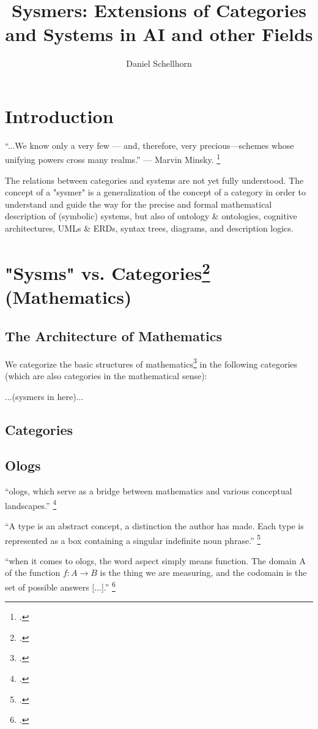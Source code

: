 \documentclass[12pt,a4paper]{article}
\title{Sysmers: Extensions of Categories and Systems in AI and other Fields}
\author{Daniel Schellhorn}
\begin{document}
\maketitle

\section{Introduction}
“...We know only a very few — and, therefore, very precious—schemes whose unifying powers cross many realms.” — Marvin Minsky. \footcite[?]{Minsky1988}
\newline

The relations between categories and systems are not yet fully understood. The concept of a "sysmer" is a generalization of the concept of a category in order to understand and guide the way for the precise and formal mathematical description of (symbolic) systems, but also of ontology \& ontologies, cognitive architectures, UMLs \& ERDs, syntax trees, diagrams, and description logics.

\section{"Sysms" vs. Categories\footcite{MacLane1997} (Mathematics)}

\subsection{The Architecture of Mathematics}
We categorize the basic structures of mathematics\footcite[68]{Basieux2000} in the following categories (which are also categories in the mathematical sense):

...(sysmers in here)...

\subsection{Categories}

\subsection{Ologs}
``ologs, which serve as a bridge between mathematics and various conceptual landscapes.'' \footcite[24]{Spivak2014}

``A type is an abstract concept, a distinction the author has made. Each type is represented as a box containing a singular indefinite noun phrase.'' \footcite[25]{Spivak2014}

``when it comes to ologs, the word aspect simply means function. The domain A of the function \( f: A \to B \) is the thing we are measuring, and the codomain is the set of possible answers [...].'' \footcite[27]{Spivak2014}
\end{document}
